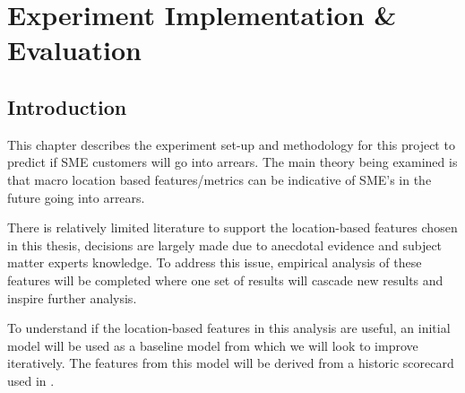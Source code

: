 
\chapter{Experiment Implementation \& Evaluation} %

\label{Chapter5} %


\section{Introduction}
This chapter describes the experiment set-up and methodology for this project to predict if SME customers will go into arrears. The main theory being examined is that macro location based features/metrics can be indicative of SME's in the future going into arrears.  

There is relatively limited literature to support the location-based features chosen in this thesis, decisions are largely made due to anecdotal evidence and subject matter experts knowledge. To address this issue, empirical analysis of these features will be completed where one set of results will cascade new results and inspire further analysis. 

To understand if the location-based features in this analysis are useful, an initial model will be used as a baseline model from which we will look to improve iteratively. The features from this model will be derived from a historic scorecard used in \subjectname.  



